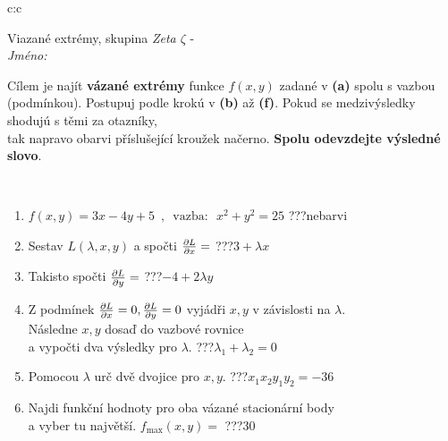 \documentclass[10pt]{report}
\begin{document}
\begin{tabular}{c:c}
\begin{minipage}[c][104.5mm][t]{0.5\linewidth}
\begin{center}
\vspace{7mm}
{\huge Viazané extrémy, skupina \textit{Zeta $\zeta$} -}\\[5mm]
\textit{Jméno:}\phantom{xxxxxxxxxxxxxxxxxxxxxxxxxxxxxxxxxxxxxxxxxxxxxxxxxxxxxxxxxxxxxxxxx}\\[5mm]
\begin{minipage}{0.95\linewidth}
\begin{center}
Cílem je najít \textbf{vázané extrémy} funkce $f(x,y)$ zadané v \textbf{(a)} spolu s vazbou (podmínkou). Postupuj podle krokú v \textbf{(b)} až \textbf{(f)}. Pokud se medzivýsledky shodujú s těmi za otazníky,\\tak napravo obarvi příslušející kroužek načerno. \textbf{Spolu odevzdejte výsledné slovo}.
\end{center}
\end{minipage}
\\[1mm]
\begin{minipage}{0.79\linewidth}
\begin{center}
\begin{varwidth}{\linewidth}
\begin{enumerate}
\normalsize
\item $f(x,y)=3x-4y+5 \enspace , \enspace \mathrm{vazba:} \enspace x^2+y^2=25$\quad \dotfill\; ???\;\dotfill \quad nebarvi
\item Sestav $L(\lambda,x,y)$ a spočti $\pdv{L}{x}=$\quad \dotfill\; ???\;\dotfill \quad $3+\lambda x$
\item Takisto spočti $\pdv{L}{y}=$\quad \dotfill\; ???\;\dotfill \quad $-4+2\lambda y$
\item Z podmínek $\pdv{L}{x}=0 , \pdv{L}{y}=0$ vyjádři $x,y$ v závislosti na $\lambda$.\\ \phantom{xxxxxx}Následne $x,y$ dosaď do vazbové rovnice\\ \phantom{xxxxxx}a vypočti dva výsledky pro $\lambda$.\quad \dotfill\; ???\;\dotfill \quad $\lambda_1+\lambda_2=0$
\item Pomocou $\lambda$ urč dvě dvojice pro $x,y$.\quad \dotfill\; ???\;\dotfill \quad $x_1 x_2 y_1 y_2=-36$
\item Najdi funkční hodnoty pro oba vázané stacionární body\\ \phantom{xxxxxx}a vyber tu najvětší. $f_{\text{max}}(x,y)=$\quad \dotfill\; ???\;\dotfill \quad $30$

\end{enumerate}
\end{varwidth}
\end{center}
\end{minipage}
\end{center}
\end{minipage}
\end{tabular}
\end{document}
